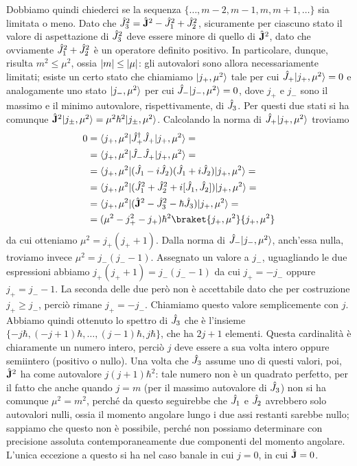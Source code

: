 Dobbiamo quindi chiederci se la sequenza $\{\dots,m-2,m-1,m,m+1,\dots\}$ sia limitata o meno.
Dato che $\hat{J}_3^2=\hat{\mathbf{J}}^2-\hat{J}_1^2+\hat{J}_2^2$, sicuramente per ciascuno stato il valore di aspettazione di $\hat{J}_3^2$ deve essere minore di quello di $\hat{\mathbf{J}}^2$, dato che ovviamente $\hat{J}_1^2+\hat{J}_2^2$ è un operatore definito positivo.
In particolare, dunque, risulta $m^2\le\mu^2$, ossia $\lvert m\rvert\le\lvert\mu\rvert$: gli autovalori sono allora necessariamente limitati; esiste un certo stato che chiamiamo $\lvert j_+,\mu^2\rangle$ tale per cui $\hat{J}_+\lvert j_+,\mu^2\rangle=0$ e analogamente uno stato $\lvert j_-,\mu^2\rangle$ per cui $\hat{J}_-\lvert j_-,\mu^2\rangle=0$, dove $j_+$ e $j_-$ sono il massimo e il minimo autovalore, rispettivamente, di $\hat{J}_3$.
Per questi due stati si ha comunque $\hat{\mathbf{J}}^2\lvert j_\pm,\mu^2\rangle=\mu^2\hbar^2\lvert j_\pm,\mu^2\rangle$.
Calcolando la norma di $\hat{J}_+\lvert j_+,\mu^2\rangle$ troviamo
\begin{equation}
	\begin{split}
		0&=\bra{j_+,\mu^2}\adj{\op J_+}\op J_+\ket{j_+,\mu^2}=\\
		&=\bra{j_+,\mu^2}\op J_-\op J_+\ket{j_+,\mu^2}=\\
		&=\bra{j_+,\mu^2}(\op J_1-i\op J_2)(\op J_1+i\op J_2)\ket{j_+,\mu^2}=\\
		&=\bra{j_+,\mu^2}(\op J_1^2+\op J_2^2+i[\op J_1,\op J_2])\ket{j_+,\mu^2}=\\
		&=\bra{j_+,\mu^2}(\op{\vec J}^2-\op J_3^2-\hbar\op J_3)\ket{j_+,\mu^2}=\\
		&=(\mu^2-j_+^2-j_+)\hbar^2\braket{j_+,\mu^2}{j_+,\mu^2}
	\end{split}
\end{equation}
da cui otteniamo $\mu^2=j_+(j_++1)$.
Dalla norma di $\hat{J}_-\lvert j_-,\mu^2\rangle$, anch'essa nulla, troviamo invece $\mu^2=j_-(j_--1)$.
Assegnato un valore a $j_-$, uguagliando le due espressioni abbiamo $j_+(j_++1)=j_-(j_--1)$ da cui $j_+=-j_-$ oppure $j_+=j_--1$.
La seconda delle due però non è accettabile dato che per costruzione $j_+\ge j_-$, perciò rimane $j_+=-j_-$.
Chiamiamo questo valore semplicemente con $j$.
Abbiamo quindi ottenuto lo spettro di $\hat{J}_3$ che è l'insieme $\{-j\hbar,(-j+1)\hbar,\dots,(j-1)\hbar,j\hbar\}$, che ha $2j+1$ elementi.
Questa cardinalità è chiaramente un numero intero, perciò $j$ deve essere a sua volta intero oppure semiintero (positivo o nullo).
Una volta che $\hat{J}_3$ assume uno di questi valori, poi, $\hat{\mathbf{J}}^2$ ha come autovalore $j(j+1)\hbar^2$: tale numero non è un quadrato perfetto, per il fatto che anche quando $j=m$ (per il massimo autovalore di $\hat{J}_3$) non si ha comunque $\mu^2=m^2$, perch\'e da questo seguirebbe che $\hat{J}_1$ e $\hat{J}_2$ avrebbero solo autovalori nulli, ossia il momento angolare lungo i due assi restanti sarebbe nullo; sappiamo che questo non è possibile, perch\'e non possiamo determinare con precisione assoluta contemporaneamente due componenti del momento angolare.
L'unica eccezione a questo si ha nel caso banale in cui $j=0$, in cui $\hat{\mathbf{J}}=0$.

